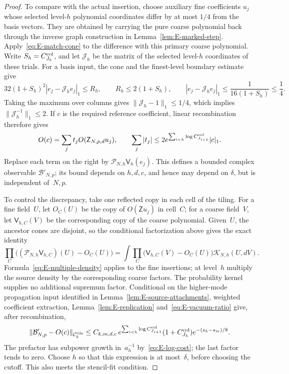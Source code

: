 \begin{proof}
To compare with the actual insertion, choose auxiliary fine coefficients $u_j$ whose selected level-$h$ polynomial coordinates differ by at most $1/4$ from the basis vectors. They are obtained by carrying the pure coarse polynomial back through the inverse graph construction in Lemma~\ref{lem:E-marked-step}. Apply~\eqref{eq:E-match-cone} to the difference with this primary coarse polynomial. Write $S_h=C^{\rm col}_{J_h}$, and let $\mathcal J_h$ be the matrix of the selected level-$h$ coordinates of these trials. For a basis input, the cone and the finest-level boundary estimate give
\begin{equation}\label{eq:E-coarse-inversion}
 32(1+S_h)^2|e_j-\mathcal J_he_j|_1\le R_h,
 \qquad R_h\le2(1+S_h),\qquad
 |e_j-\mathcal J_he_j|_1\le\frac1{16(1+S_h)}\le\frac14.
\end{equation}
Taking the maximum over columns gives $\|\mathcal J_h-1\|_1\le1/4$, which implies $\|\mathcal J_h^{-1}\|_1\le2$. If $c$ is the required reference coefficient, linear recombination therefore gives
\begin{equation*}
 O(c)=\sum_j t_j O(\mathsf Z_{N,p,d}u_j),\qquad
 \sum_j|t_j|\le2e^{\sum_{i<h}\log C^{\rm col}_{J_{i+1}}}|c|_1.
\end{equation*}
Replace each term on the right by $\mathcal P_{N,h}\mathsf V_h(e_j)$. This defines a bounded complex observable $\mathcal B'_{N,p}$; its bound depends on $h,d,c$, and hence may depend on $\delta$, but is independent of~$N,p$.

To control the discrepancy, take one reflected copy in each cell of the tiling. For a fine field~$U$, let $O_C(U)$ be the copy of $O(\mathsf Z u_j)$ in cell~$C$; for a coarse field~$V$, let $\mathsf V_{h,C}(V)$ be the corresponding copy of the coarse polynomial. Given~$U$, the ancestor cones are disjoint, so the conditional factorization above gives the exact identity
\begin{equation*}
 \prod_C\bigl((\mathcal P_{N,h}\mathsf V_{h,C})(U)-O_C(U)\bigr)
 =\int\prod_C\bigl(\mathsf V_{h,C}(V)-O_C(U)\bigr)
       \mathcal K_{N,h}(U,dV).
\end{equation*}
Formula~\eqref{eq:E-multiple-density} applies to the fine insertions; at level~$h$ multiply the source density by the corresponding coarse factors. The probability kernel supplies no additional supremum factor. Conditional on the higher-mode propagation input identified in Lemma~\ref{lem:E-source-attachments}, weighted coefficient extraction, Lemma~\ref{lem:E-replication} and~\eqref{eq:E-vacuum-ratio} give, after recombination,
\begin{equation}\label{eq:E-bounded-error}
 \|\mathcal B'_{N,p}-O(c)\|_{\mathcal C^{\rm tile}_k}
 \le C_{k,m,d,c}\,
 e^{\sum_{i<h}\log C^{\rm col}_{J_{i+1}}}(1+C^{\rm col}_{J_h})
 e^{-(s_h-s_m)/8}.
\end{equation}
The prefactor has subpower growth in~$a_h^{-1}$ by~\eqref{eq:E-log-cost}; the last factor tends to zero. Choose $h$ so that this expression is at most~$\delta$, before choosing the cutoff. This also meets the stencil-fit condition.


\end{proof}
